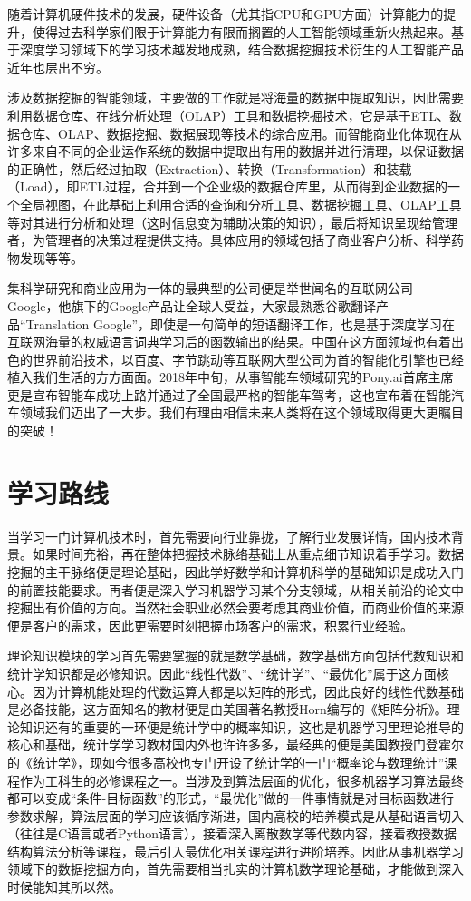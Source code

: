 \documentclass{misc/elegantpaper}
\begin{document}
随着计算机硬件技术的发展，硬件设备（尤其指CPU和GPU方面）计算能力的提升，使得过去科学家们限于计算能力有限而搁置的人工智能领域重新火热起来。基于深度学习领域下的学习技术越发地成熟，结合数据挖掘技术衍生的人工智能产品近年也层出不穷。

涉及数据挖掘的智能领域，主要做的工作就是将海量的数据中提取知识，因此需要利用数据仓库、在线分析处理（OLAP）工具和数据挖掘技术，它是基于ETL、数据仓库、OLAP、数据挖掘、数据展现等技术的综合应用。而智能商业化体现在从许多来自不同的企业运作系统的数据中提取出有用的数据并进行清理，以保证数据的正确性，然后经过抽取（Extraction）、转换（Transformation）和装载（Load），即ETL过程，合并到一个企业级的数据仓库里，从而得到企业数据的一个全局视图，在此基础上利用合适的查询和分析工具、数据挖掘工具、OLAP工具等对其进行分析和处理（这时信息变为辅助决策的知识），最后将知识呈现给管理者，为管理者的决策过程提供支持。具体应用的领域包括了商业客户分析、科学药物发现等等。

集科学研究和商业应用为一体的最典型的公司便是举世闻名的互联网公司Google，他旗下的Google产品让全球人受益，大家最熟悉谷歌翻译产品“Translation Google”，即使是一句简单的短语翻译工作，也是基于深度学习在互联网海量的权威语言词典学习后的函数输出的结果。中国在这方面领域也有着出色的世界前沿技术，以百度、字节跳动等互联网大型公司为首的智能化引擎也已经植入我们生活的方方面面。2018年中旬，从事智能车领域研究的Pony.ai首席主席更是宣布智能车成功上路并通过了全国最严格的智能车驾考，这也宣布着在智能汽车领域我们迈出了一大步。我们有理由相信未来人类将在这个领域取得更大更瞩目的突破！

\section{学习路线}

当学习一门计算机技术时，首先需要向行业靠拢，了解行业发展详情，国内技术背景。如果时间充裕，再在整体把握技术脉络基础上从重点细节知识着手学习。数据挖掘的主干脉络便是理论基础，因此学好数学和计算机科学的基础知识是成功入门的前置技能要求。再者便是深入学习机器学习某个分支领域，从相关前沿的论文中挖掘出有价值的方向。当然社会职业必然会要考虑其商业价值，而商业价值的来源便是客户的需求，因此更需要时刻把握市场客户的需求，积累行业经验。

理论知识模块的学习首先需要掌握的就是数学基础，数学基础方面包括代数知识和统计学知识都是必修知识。因此“线性代数”、“统计学”、“最优化”属于这方面核心。因为计算机能处理的代数运算大都是以矩阵的形式，因此良好的线性代数基础是必备技能，这方面知名的教材便是由美国著名教授Horn编写的《矩阵分析》。理论知识还有的重要的一环便是统计学中的概率知识，这也是机器学习里理论推导的核心和基础，统计学学习教材国内外也许许多多，最经典的便是美国教授门登霍尔的《统计学》，现如今很多高校也专门开设了统计学的一门“概率论与数理统计”课程作为工科生的必修课程之一。当涉及到算法层面的优化，很多机器学习算法最终都可以变成“条件-目标函数”的形式，“最优化”做的一件事情就是对目标函数进行参数求解，算法层面的学习应该循序渐进，国内高校的培养模式是从基础语言切入（往往是C语言或者Python语言），接着深入离散数学等代数内容，接着教授数据结构算法分析等课程，最后引入最优化相关课程进行进阶培养。因此从事机器学习领域下的数据挖掘方向，首先需要相当扎实的计算机数学理论基础，才能做到深入时候能知其所以然。
\end{document}

